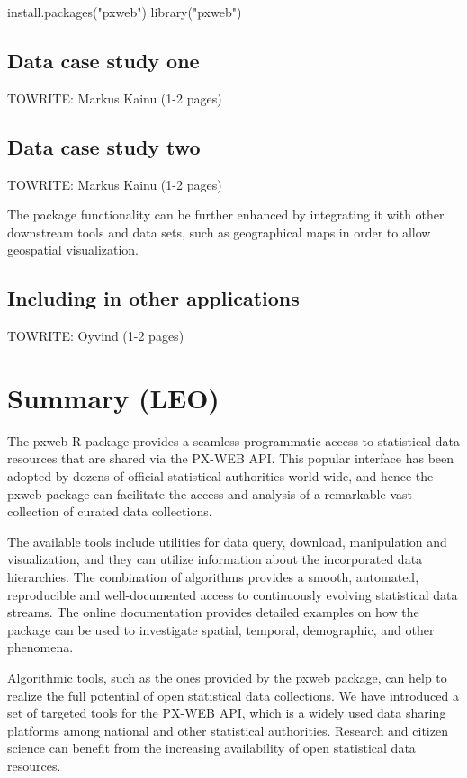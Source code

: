 \documentclass[article]{jss}
\begin{document}
\begin{example}
  install.packages("pxweb")
  library("pxweb")
\end{example}



\subsection{Data case study one}

TOWRITE: Markus Kainu (1-2 pages)

\subsection{Data case study two}

TOWRITE: Markus Kainu (1-2 pages)

The package functionality can be further enhanced by integrating it with other downstream tools and data sets, such as geographical maps in order to allow geospatial visualization.


\subsection{Including  in other applications}

TOWRITE: Oyvind (1-2 pages)

\section[summary]{Summary (LEO)}

The pxweb R package provides a seamless programmatic access to statistical data resources that are shared via the PX-WEB API. This popular interface has been adopted by dozens of official statistical authorities world-wide, and hence the pxweb package can facilitate the access and analysis of a remarkable vast collection of curated data collections. 

The available tools include utilities for data query, download, manipulation and visualization, and they can utilize information about the incorporated data hierarchies. The combination of algorithms provides a smooth, automated, reproducible and well-documented access to continuously evolving statistical data streams. The online documentation provides detailed examples on how the package can be used to investigate spatial, temporal, demographic, and other phenomena.

Algorithmic tools, such as the ones provided by the pxweb package, can help to realize the full potential of open statistical data collections. We have introduced a set of targeted tools for the PX-WEB API, which is a widely used data sharing platforms among national and other statistical authorities. Research and citizen science can benefit from the increasing availability of open statistical data resources. 
\end{document}
